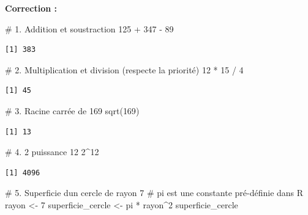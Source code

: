 \documentclass[
  french,
  11pt,
  a4paper,
]{article}
\newenvironment{Shaded}{}{}
\newcommand{\CommentTok}[1]{\textcolor[rgb]{0.42,0.45,0.49}{#1}}
\newcommand{\DecValTok}[1]{\textcolor[rgb]{0.00,0.36,0.77}{#1}}
\newcommand{\FunctionTok}[1]{\textcolor[rgb]{0.44,0.26,0.76}{#1}}
\newcommand{\NormalTok}[1]{\textcolor[rgb]{0.14,0.16,0.18}{#1}}
\newcommand{\OtherTok}[1]{\textcolor[rgb]{0.44,0.26,0.76}{#1}}
\newcommand{\SpecialCharTok}[1]{\textcolor[rgb]{0.00,0.36,0.77}{#1}}
\begin{document}
\textbf{Correction :}

\begin{Shaded}
\begin{Highlighting}[]
\CommentTok{\# 1. Addition et soustraction}
\DecValTok{125} \SpecialCharTok{+} \DecValTok{347} \SpecialCharTok{{-}} \DecValTok{89}
\end{Highlighting}
\end{Shaded}

\begin{verbatim}
[1] 383
\end{verbatim}

\begin{Shaded}
\begin{Highlighting}[]
\CommentTok{\# 2. Multiplication et division (respecte la priorité)}
\DecValTok{12} \SpecialCharTok{*} \DecValTok{15} \SpecialCharTok{/} \DecValTok{4}
\end{Highlighting}
\end{Shaded}

\begin{verbatim}
[1] 45
\end{verbatim}

\begin{Shaded}
\begin{Highlighting}[]
\CommentTok{\# 3. Racine carrée de 169}
\FunctionTok{sqrt}\NormalTok{(}\DecValTok{169}\NormalTok{)}
\end{Highlighting}
\end{Shaded}

\begin{verbatim}
[1] 13
\end{verbatim}

\begin{Shaded}
\begin{Highlighting}[]
\CommentTok{\# 4. 2 puissance 12}
\DecValTok{2}\SpecialCharTok{\^{}}\DecValTok{12}
\end{Highlighting}
\end{Shaded}

\begin{verbatim}
[1] 4096
\end{verbatim}

\begin{Shaded}
\begin{Highlighting}[]
\CommentTok{\# 5. Superficie d\textquotesingle{}un cercle de rayon 7}
\CommentTok{\# pi est une constante pré{-}définie dans R}
\NormalTok{rayon }\OtherTok{\textless{}{-}} \DecValTok{7}
\NormalTok{superficie\_cercle }\OtherTok{\textless{}{-}}\NormalTok{ pi }\SpecialCharTok{*}\NormalTok{ rayon}\SpecialCharTok{\^{}}\DecValTok{2}
\NormalTok{superficie\_cercle}
\end{Highlighting}
\end{Shaded}
\end{document}
